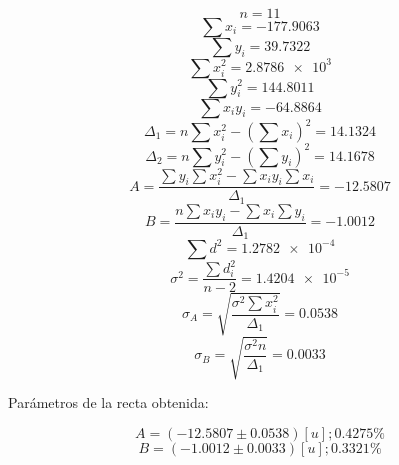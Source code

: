 \documentclass[letter,11pt]{article}
\begin{document}
\begin{equation*}
    n = 11
\end{equation*}
\begin{equation*}
    \sum x_i = -177.9063
\end{equation*}
\begin{equation*}
    \sum y_i = 39.7322
\end{equation*}
\begin{equation*}
    \sum x^2_i = \num{2.8786e3}
\end{equation*}
\begin{equation*}
    \sum y^2_i = 144.8011
\end{equation*}
\begin{equation*}
    \sum x_i y_i = -64.8864
\end{equation*}
\begin{equation*}
    \Delta_1 = n \sum x^2_i - \left( \sum x_i \right)^2 = 14.1324
\end{equation*}
\begin{equation*}
    \Delta_2 = n \sum y^2_i - \left( \sum y_i \right)^2 = 14.1678
\end{equation*}
\begin{equation*}
    A = \frac{\sum y_i \sum x^2_i - \sum x_i y_i \sum x_i}{\Delta_1} = -12.5807
\end{equation*}
\begin{equation*}
    B = \frac{n \sum x_i y_i - \sum x_i \sum y_i}{\Delta_1} = -1.0012
\end{equation*}
\begin{equation*}
    \sum d^2 = \num{1.2782e-4}
\end{equation*}
\begin{equation*}
    \sigma^2 = \frac{\sum d^2_i}{n-2} = \num{1.4204e-5}
\end{equation*}
\begin{equation*}
    \sigma_A = \sqrt{\frac{\sigma^2 \sum x^2_i}{\Delta_1}} = 0.0538
\end{equation*}
\begin{equation*}
    \sigma_B = \sqrt{\frac{\sigma^2 n}{\Delta_1}} = 0.0033
\end{equation*}
\vspace{0.10cm}

Parámetros de la recta obtenida:

\begin{equation*}
    A = (-12.5807 \pm 0.0538) [u]; 0.4275 \%
\end{equation*}
\begin{equation*}
    B = (-1.0012 \pm 0.0033) [u]; 0.3321 \%
\end{equation*}
\vspace{0.10cm}
\end{document}
